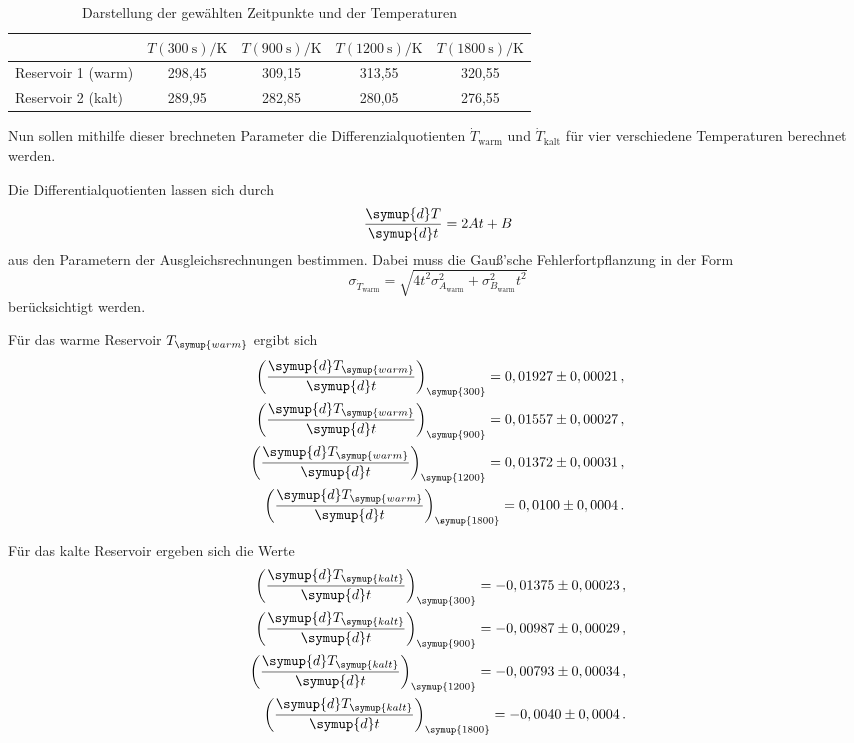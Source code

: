 \begin{table}[h]
		\centering
    \caption{Darstellung der gewählten Zeitpunkte und der Temperaturen}
		\label{fig:ausgewaehltemesswerte}
		\begin{tabular}{lcccc}
			\toprule
			& $T(\SI{300}{\second}) / \text{K}$ & $T(\SI{900}{\second}) / \text{K}$ & $T(\SI{1200}{\second}) / \text{K}$ & $T(\SI{1800}{\second}) / \text{K}$\\
			\midrule
			Reservoir 1 (warm) & 298,45 & 309,15 & 313,55 & 320,55 \\
			Reservoir 2 (kalt) & 289,95 & 282,85 & 280,05 & 276,55 \\
			\bottomrule
		\end{tabular}
	\end{table}

Nun sollen mithilfe dieser brechneten Parameter die Differenzialquotienten
$\dot{T}_\text{warm}$ und $\dot{T}_\text{kalt}$ für vier verschiedene Temperaturen berechnet werden.

Die Differentialquotienten lassen sich durch
\begin{equation}
  \frac{\symup{d}T}{\symup{d}t}=2At+B
\end{equation}
aus den Parametern der Ausgleichsrechnungen bestimmen. Dabei muss die Gauß'sche
Fehlerfortpflanzung in der Form
\begin{equation}
  \sigma_{\dot{T}_\text{warm}} = \sqrt{4 t^2 \sigma_{A_\text{warm}}^{2} + \sigma_{B_\text{warm}}^{2} t^{2}}
\end{equation}
berücksichtigt werden.

Für das warme Reservoir $T_{\symup{warm}}$ ergibt sich
\begin{align*}
  \biggl(\frac{\symup{d}T_{\symup{warm}}}{\symup{d}t}\biggr)_{\symup{300}} = 0,01927\pm0,00021 \,,\\
  \biggl(\frac{\symup{d}T_{\symup{warm}}}{\symup{d}t}\biggr)_{\symup{900}} =  0,01557\pm0,00027\,,\\
  \biggl(\frac{\symup{d}T_{\symup{warm}}}{\symup{d}t}\biggr)_{\symup{1200}} = 0,01372\pm0,00031\,,\\
  \biggl(\frac{\symup{d}T_{\symup{warm}}}{\symup{d}t}\biggr)_{\symup{1800}} = 0,0100\pm0,0004\,.\\
\end{align*}


Für das kalte Reservoir ergeben sich die Werte
\begin{align*}
  \biggl(\frac{\symup{d}T_{\symup{kalt}}}{\symup{d}t}\biggr)_{\symup{300}} = -0,01375\pm0,00023 \,,\\
  \biggl(\frac{\symup{d}T_{\symup{kalt}}}{\symup{d}t}\biggr)_{\symup{900}} =  -0,00987\pm0,00029\,,\\
  \biggl(\frac{\symup{d}T_{\symup{kalt}}}{\symup{d}t}\biggr)_{\symup{1200}} = -0,00793\pm0,00034\,,\\
  \biggl(\frac{\symup{d}T_{\symup{kalt}}}{\symup{d}t}\biggr)_{\symup{1800}} = -0,0040\pm0,0004\,.\\
\end{align*}

